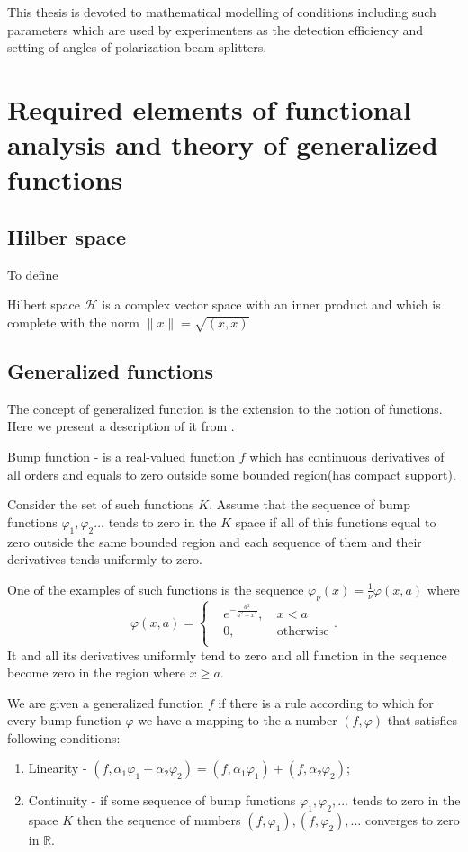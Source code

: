 \documentclass[11pt]{article}
\newenvironment{definition}[1][Definition]{\begin{trivlist}
\item[\hskip \labelsep {\bfseries #1}]}{\end{trivlist}}
\begin{document}
This thesis is devoted to mathematical modelling of conditions
including such parameters which are used by experimenters as the detection efficiency and setting of angles of polarization beam splitters.

\section{Required elements of functional analysis and theory of generalized functions}
\subsection{Hilber space}
To define
\begin{definition}
Hilbert space $\mathcal{H}$ is a complex vector space with an inner product and which is complete with the norm $\|x\| = \sqrt{(x, x)}$
\end{definition}
\subsection{Generalized functions}
The concept of generalized function is the extension to the notion of  functions. Here we present a description of it from \cite{gelfand}.

\begin{definition}
Bump function - is a real-valued function $f$ which has continuous derivatives of all orders and equals to zero outside some bounded region(has compact support).
\end{definition}
Consider the set of such functions $K$. Assume that the sequence of bump functions $\varphi_1,\varphi_2\ldots$ tends to zero in the $K$ space if all of this functions equal to zero outside the same bounded region and each sequence of them and their derivatives tends uniformly to zero.

One of the examples of such functions is the sequence $\varphi_\nu(x) = \frac{1}{\nu}\varphi(x, a)$ where 
\[
\varphi(x, a) = \left\{
\begin{aligned}
&e^{-\frac{a^2}{a^2 - x^2}},&\ x<a\\
&0,&\ \mbox{otherwise}\\
\end{aligned} \right. .
\]
It and all its derivatives uniformly tend to zero and all function in the sequence become zero in the region where $x \geq a$.

\begin{definition}
We are given a generalized function $f$ if there is a rule according to which for every bump function $\varphi$ we have a mapping to the a number $(f, \varphi)$ that satisfies following conditions:
\begin{enumerate}
\item Linearity - $(f, \alpha_1\varphi_1 + \alpha_2\varphi_2) = (f, \alpha_1\varphi_1) + (f, \alpha_2\varphi_2)$;
\item Continuity - if some sequence of bump functions $\varphi_1,\varphi_2,\ldots$ tends to zero in the space $K$ then the sequence of numbers $(f, \varphi_1), (f, \varphi_2), \ldots$ converges to zero in $\mathbb{R}$.
\end{enumerate}
\end{definition}
\end{document}
